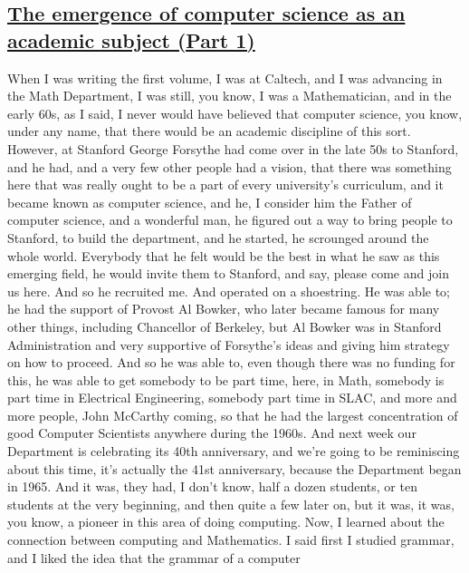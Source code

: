 \documentclass[]{article}
\begin{document}
\subsection{\texorpdfstring{\href{http://webofstories.com/play/17102}{The
emergence of computer science as an academic subject (Part
1)}}{The emergence of computer science as an academic subject (Part 1)}}\label{the-emergence-of-computer-science-as-an-academic-subject-part-1}

When I was writing the first volume, I was at Caltech, and I was
advancing in the Math Department, I was still, you know, I was a
Mathematician, and in the early 60s, as I said, I never would have
believed that computer science, you know, under any name, that there
would be an academic discipline of this sort. However, at Stanford
George Forsythe had come over in the late 50s to Stanford, and he had,
and a very few other people had a vision, that there was something here
that was really ought to be a part of every university's curriculum, and
it became known as computer science, and he, I consider him the Father
of computer science, and a wonderful man, he figured out a way to bring
people to Stanford, to build the department, and he started, he
scrounged around the whole world. Everybody that he felt would be the
best in what he saw as this emerging field, he would invite them to
Stanford, and say, please come and join us here. And so he recruited me.
And operated on a shoestring. He was able to; he had the support of
Provost Al Bowker, who later became famous for many other things,
including Chancellor of Berkeley, but Al Bowker was in Stanford
Administration and very supportive of Forsythe's ideas and giving him
strategy on how to proceed. And so he was able to, even though there was
no funding for this, he was able to get somebody to be part time, here,
in Math, somebody is part time in Electrical Engineering, somebody part
time in SLAC, and more and more people, John McCarthy coming, so that he
had the largest concentration of good Computer Scientists anywhere
during the 1960s. And next week our Department is celebrating its 40th
anniversary, and we're going to be reminiscing about this time, it's
actually the 41st anniversary, because the Department began in 1965. And
it was, they had, I don't know, half a dozen students, or ten students
at the very beginning, and then quite a few later on, but it was, it
was, you know, a pioneer in this area of doing computing. Now, I learned
about the connection between computing and Mathematics. I said first I
studied grammar, and I liked the idea that the grammar of a computer
\end{document}

